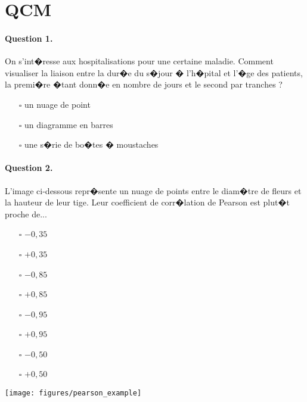 \section{QCM}
\paragraph{Question 1.} On s'int�resse aux hospitalisations pour une certaine
maladie. Comment visualiser la liaison entre la dur�e du s�jour � l'h�pital et
l'�ge des patients, la premi�re �tant donn�e en nombre de jours et le second
par tranches ?
\begin{itemize}
\item[$\square$] un nuage de point 
\item[$\square$] un diagramme en barres
\item[$\square$] une s�rie de bo�tes � moustaches
\end{itemize}

\paragraph{Question 2.} L'image ci-dessous repr�sente un nuage de points entre
le diam�tre de fleurs et la hauteur de leur tige. Leur coefficient de
corr�lation de Pearson est plut�t proche de...
\begin{itemize}
\item[$\square$] $- 0,35$
\item[$\square$] $+ 0,35$
\item[$\square$] $- 0,85$
\item[$\square$] $+ 0,85$
\item[$\square$] $- 0,95$
\item[$\square$] $+ 0,95$
\item[$\square$] $- 0,50$
\item[$\square$] $+ 0,50$
\end{itemize}

\vspace{-13em}
\begin{center}
  \texttt{[image: figures/pearson\_example]}
\end{center}



